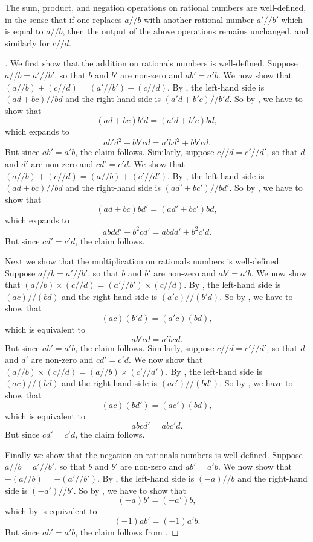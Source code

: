 \begin{lem}\label{i:4.2.3}
  The sum, product, and negation operations on rational numbers are well-defined, in the sense that if one replaces \(a // b\) with another rational number \(a' // b'\) which is equal to \(a // b\), then the output of the above operations remains unchanged, and similarly for \(c // d\).
\end{lem}

\begin{proof}[]
  We first show that the addition on rationals numbers is well-defined.
  Suppose \(a // b = a' // b'\), so that \(b\) and \(b'\) are non-zero and \(ab' = a'b\).
  We now show that \((a // b) + (c // d) = (a' // b') + (c // d)\).
  By , the left-hand side is \((ad + bc) // bd\) and the right-hand side is \((a'd + b'c) // b'd\).
  So by , we have to show that
  \[
    (ad + bc)b'd = (a'd + b'c)bd,
  \]
  which expands to
  \[
    ab'd^2 + bb'cd = a'bd^2 + bb'cd.
  \]
  But since \(ab' = a'b\), the claim follows.
  Similarly, suppose \(c // d = c' // d'\), so that \(d\) and \(d'\) are non-zero and \(cd' = c'd\).
  We show that \((a // b) + (c // d) = (a // b) + (c' // d')\).
  By , the left-hand side is \((ad + bc) // bd\) and the right-hand side is \((ad' + bc') // bd'\).
  So by , we have to show that
  \[
    (ad + bc)bd' = (ad' + bc')bd,
  \]
  which expands to
  \[
    abdd' + b^2cd' = abdd' + b^2c'd.
  \]
  But since \(cd' = c'd\), the claim follows.

  Next we show that the multiplication on rationals numbers is well-defined.
  Suppose \(a // b = a' // b'\), so that \(b\) and \(b'\) are non-zero and \(ab' = a'b\).
  We now show that \((a // b) \times (c // d) = (a' // b') \times (c // d)\).
  By , the left-hand side is \((ac) // (bd)\) and the right-hand side is \((a'c) // (b'd)\).
  So by , we have to show that
  \[
    (ac)(b'd) = (a'c)(bd),
  \]
  which is equivalent to
  \[
    ab'cd = a'bcd.
  \]
  But since \(ab' = a'b\), the claim follows.
  Similarly, suppose \(c // d = c' // d'\), so that \(d\) and \(d'\) are non-zero and \(cd' = c'd\).
  We now show that \((a // b) \times (c // d) = (a // b) \times (c' // d')\).
  By , the left-hand side is \((ac) // (bd)\) and the right-hand side is \((ac') // (bd')\).
  So by , we have to show that
  \[
    (ac)(bd') = (ac')(bd),
  \]
  which is equivalent to
  \[
    abcd' = abc'd.
  \]
  But since \(cd' = c'd\), the claim follows.

  Finally we show that the negation on rationals numbers is well-defined.
  Suppose \(a // b = a' // b'\), so that \(b\) and \(b'\) are non-zero and \(ab' = a'b\).
  We now show that \(-(a // b) = -(a' // b')\).
  By , the left-hand side is \((-a) // b\) and the right-hand side is \((-a') // b'\).
  So by , we have to show that
  \[
    (-a)b' = (-a')b,
  \]
  which by  is equivalent to
  \[
    (-1)ab' = (-1)a'b.
  \]
  But since \(ab' = a'b\), the claim follows from .
\end{proof}

